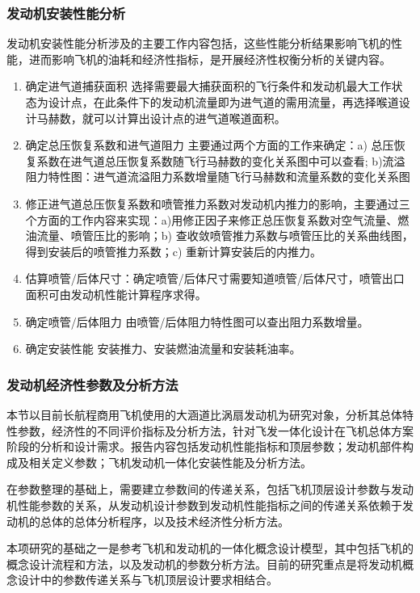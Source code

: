 \documentclass[12pt,a4paper]{report}
\begin{document}
\subsubsection{发动机安装性能分析}
发动机安装性能分析涉及的主要工作内容包括，这些性能分析结果影响飞机的性能，进而影响飞机的油耗和经济性指标，是开展经济性权衡分析的关键内容。

\begin{enumerate}
\item 确定进气道捕获面积 \textemdash 选择需要最大捕获面积的飞行条件和发动机最大工作状态为设计点，在此条件下的发动机流量即为进气道的需用流量，再选择喉道设计马赫数，就可以计算出设计点的进气道喉道面积。
\item 确定总压恢复系数和进气道阻力 \textemdash 主要通过两个方面的工作来确定：a) 总压恢复系数在进气道总压恢复系数随飞行马赫数的变化关系图中可以查看; b)流溢阻力特性图：进气道流溢阻力系数增量随飞行马赫数和流量系数的变化关系图
\item 修正进气道总压恢复系数和喷管推力系数对发动机内推力的影响，主要通过三个方面的工作内容来实现：a)用修正因子来修正总压恢复系数对空气流量、燃油流量、喷管压比的影响；b)	查收敛喷管推力系数与喷管压比的关系曲线图，得到安装后的喷管推力系数；c)	重新计算安装后的内推力。
\item 估算喷管/后体尺寸：确定喷管/后体尺寸需要知道喷管/后体尺寸，喷管出口面积可由发动机性能计算程序求得。
\item 确定喷管/后体阻力 \textemdash 由喷管/后体阻力特性图可以查出阻力系数增量。
\item 确定安装性能 \textemdash 安装推力、安装燃油流量和安装耗油率。
\end{enumerate}


\subsubsection{发动机经济性参数及分析方法}
本节以目前长航程商用飞机使用的大涵道比涡扇发动机为研究对象，分析其总体特性参数，经济性的不同评价指标及分析方法，针对飞发一体化设计在飞机总体方案阶段的分析和设计需求。报告内容包括发动机性能指标和顶层参数；发动机部件构成及相关定义参数；飞机发动机一体化安装性能及分析方法。

在参数整理的基础上，需要建立参数间的传递关系，包括飞机顶层设计参数与发动机性能参数的关系，从发动机设计参数到发动机性能指标之间的传递关系依赖于发动机的总体的总体分析程序，以及技术经济性分析方法。

本项研究的基础之一是参考飞机和发动机的一体化概念设计模型，其中包括飞机的概念设计流程和方法，以及发动机的参数分析方法。目前的研究重点是将发动机概念设计中的参数传递关系与飞机顶层设计要求相结合。
\end{document}
